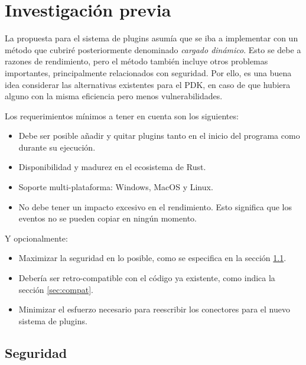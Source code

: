 
\chapter{Investigación previa}

La propuesta para el sistema de plugins asumía que se iba a implementar con un
método que cubriré posteriormente denominado \emph{cargado dinámico}. Esto se
debe a razones de rendimiento, pero el método también incluye otros problemas
importantes, principalmente relacionados con seguridad. Por ello, es una buena
idea considerar las alternativas existentes para el PDK, en caso de que hubiera
alguno con la misma eficiencia pero menos vulnerabilidades.

Los requerimientos mínimos a tener en cuenta son los siguientes:

\begin{itemize}
    \item Debe ser posible añadir y quitar plugins tanto en el inicio del
        programa como durante su ejecución.

    \item Disponibilidad y madurez en el ecosistema de Rust.

    \item Soporte multi-plataforma: Windows, MacOS y Linux.

    \item No debe tener un impacto excesivo en el rendimiento. Esto significa
        que los eventos no se pueden copiar en ningún momento.

\end{itemize}

Y opcionalmente:

\begin{itemize}
    \item Maximizar la seguridad en lo posible, como se especifica en la sección
        \ref{sec:security}.

    \item Debería ser retro-compatible con el código ya existente, como indica la
        sección \ref{sec:compat}.

    \item Minimizar el esfuerzo necesario para reescribir los conectores para el
        nuevo sistema de plugins.

\end{itemize}

\section{Seguridad}\label{sec:security}

